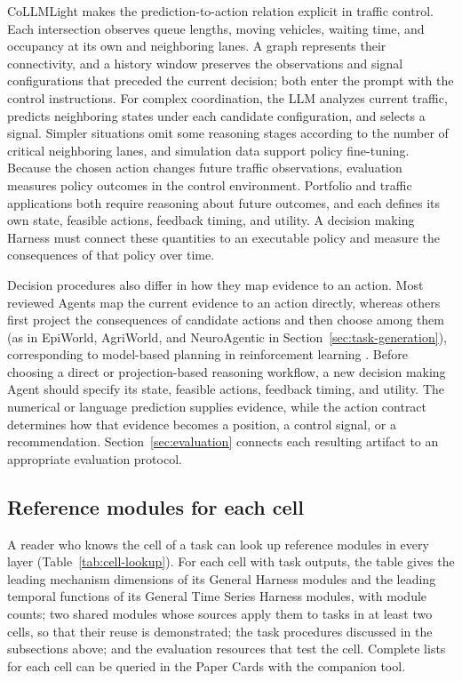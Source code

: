\documentclass[preprints,article,submit,moreauthors]{Definitions/mdpi}
\begin{document}
CoLLMLight \citep{collmllight2026} makes the prediction-to-action relation explicit in traffic control. Each intersection observes queue lengths, moving vehicles, waiting time, and occupancy at its own and neighboring lanes. A graph represents their connectivity, and a history window preserves the observations and signal configurations that preceded the current decision; both enter the prompt with the control instructions. For complex coordination, the LLM analyzes current traffic, predicts neighboring states under each candidate configuration, and selects a signal. Simpler situations omit some reasoning stages according to the number of critical neighboring lanes, and simulation data support policy fine-tuning. Because the chosen action changes future traffic observations, evaluation measures policy outcomes in the control environment. Portfolio and traffic applications both require reasoning about future outcomes, and each defines its own state, feasible actions, feedback timing, and utility. A decision making Harness must connect these quantities to an executable policy and measure the consequences of that policy over time.

Decision procedures also differ in how they map evidence to an action. Most reviewed Agents map the current evidence to an action directly, whereas others first project the consequences of candidate actions and then choose among them (as in EpiWorld, AgriWorld, and NeuroAgentic in Section~\ref{sec:task-generation}), corresponding to model-based planning in reinforcement learning \citep{sutton2018rl}. Before choosing a direct or projection-based reasoning workflow, a new decision making Agent should specify its state, feasible actions, feedback timing, and utility. The numerical or language prediction supplies evidence, while the action contract determines how that evidence becomes a position, a control signal, or a recommendation. Section~\ref{sec:evaluation} connects each resulting artifact to an appropriate evaluation protocol.

\subsection{Reference modules for each cell}
\label{sec:task-lookup}

A reader who knows the cell of a task can look up reference modules in every layer (Table~\ref{tab:cell-lookup}). For each cell with task outputs, the table gives the leading mechanism dimensions of its General Harness modules and the leading temporal functions of its General Time Series Harness modules, with module counts; two shared modules whose sources apply them to tasks in at least two cells, so that their reuse is demonstrated; the task procedures discussed in the subsections above; and the evaluation resources that test the cell. Complete lists for each cell can be queried in the Paper Cards with the companion tool.
\end{document}
